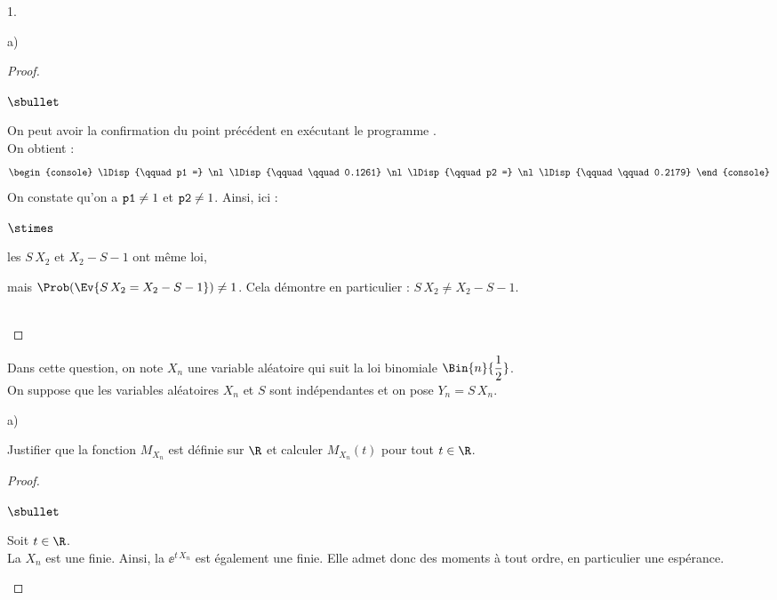 \documentclass[11pt]{article}%
\begin{document}
\begin{noliste}{1.}
\begin{noliste}{a)}
\begin{proof}
\begin{remarkL}{.98}
\begin{noliste}{$\sbullet$}
        \item On peut avoir la confirmation du point précédent en
          exécutant le programme \Scilab{}.\\
          On obtient :
          \[
            \begin{console}
              \lDisp{\qquad p1 =} \nl %
              \lDisp{\qquad \qquad 0.1261} \nl %
              \lDisp{\qquad p2 =} \nl %
              \lDisp{\qquad \qquad 0.2179}
            \end{console}
          \]
          On constate qu'on a ${\tt p1} \neq 1$ et ${\tt p2} \neq
          1$. Ainsi, ici :
          \begin{noliste}{$\stimes$}
          \item les \var $S \, X_2$ et $X_2 -S-1$ ont même loi,
            
          \item mais $\Prob(\Ev{S \, X_2 = X_2 -S-1}) \neq 1$. Cela
            démontre en particulier : $S \, X_2 \neq X_2 - S-1$.
          \end{noliste}
        \end{noliste}
      \end{remarkL}~\\[-1.4cm]
    \end{proof}
  \end{noliste}
  
\item Dans cette question, on note $X_n$ une variable aléatoire qui
  suit la loi binomiale $\Bin{n}{\dfrac{1}{2}}$.\\
  On suppose que les variables aléatoires $X_n$ et $S$ sont
  indépendantes et on pose $Y_n = S \, X_n$.
  \begin{noliste}{a)}
    \setlength{\itemsep}{2mm}
  \item Justifier que la fonction $M_{X_n}$ est définie sur $\R$ et
    calculer $M_{X_n}(t)$ pour tout $t\in \R$.
    \begin{proof}~
      \begin{noliste}{$\sbullet$}
      \item  Soit $t \in \R$.\\
        La \var $X_n$ est une \var finie. Ainsi, la \var $\ee^{t \,
          X_n}$ est également une \var finie. Elle admet donc des
        moments à tout ordre, en particulier une espérance.


        \newpage
        

\end{noliste}
\end{proof}
\end{noliste}
\end{noliste}
\end{document}
